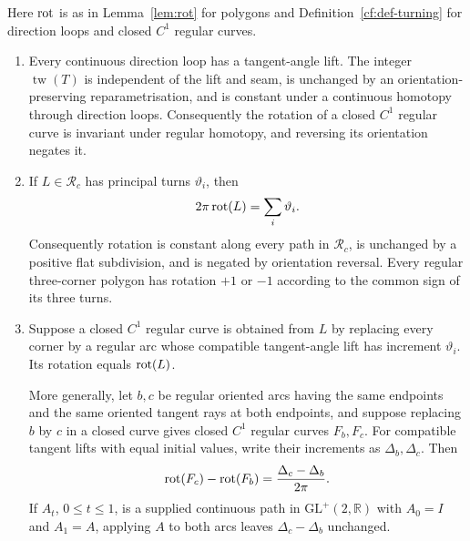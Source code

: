 \begin{lemma}\label{cf:lem-turnlift}
Here $\operatorname{rot}$ is as in Lemma~\ref{lem:rot} for polygons and
Definition~\ref{cf:def-turning} for direction loops and closed $C^1$
regular curves.
\begin{enumerate}
\item[(i)] Every continuous direction loop has a tangent-angle lift.
The integer $\operatorname{tw}(T)$ is independent of the lift and seam,
is unchanged by an orientation-preserving reparametrisation, and is constant
under a continuous homotopy through direction loops. Consequently the rotation
of a closed $C^1$ regular curve is invariant under regular homotopy, and
reversing its orientation negates it.
\item[(ii)] If $L\in\mathcal R_c$ has principal turns $\vartheta_i$, then
\[
   2\pi\operatorname{rot}(L)=\sum_i\vartheta_i.
\]
Consequently rotation is constant along every path in $\mathcal R_c$, is
unchanged by a positive flat subdivision, and is negated by orientation
reversal. Every regular three-corner polygon has rotation $+1$ or $-1$
according to the common sign of its three turns.
\item[(iii)] Suppose a closed $C^1$ regular curve is obtained from $L$ by
replacing every corner by a regular arc whose compatible tangent-angle lift
has increment $\vartheta_i$. Its rotation equals $\operatorname{rot}(L)$.

More generally, let $b,c$ be regular oriented arcs having the same endpoints
and the same oriented tangent rays at both endpoints, and suppose replacing
$b$ by $c$ in a closed curve gives closed $C^1$ regular curves $F_b,F_c$.
For compatible tangent lifts with equal initial values, write their increments
as $\Delta_b,\Delta_c$. Then
\[
   \operatorname{rot}(F_c)-\operatorname{rot}(F_b)=\frac{\Delta_c-\Delta_b}{2\pi}.
\]
If $A_t$, $0\leq t\leq1$, is a supplied continuous path in
$\mathrm{GL}^+(2,\mathbb R)$ with $A_0=I$ and $A_1=A$, applying $A$ to both
arcs leaves $\Delta_c-\Delta_b$ unchanged.
\end{enumerate}
\end{lemma}
